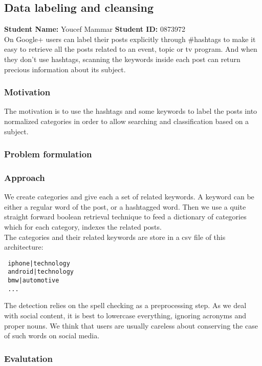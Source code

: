 \subsection{Data labeling and cleansing}
\textbf{Student Name: }Youcef Mammar \textbf{Student ID:} 0873972\\

On Google+ users can label their posts explicitly through \#hashtags to make it easy to retrieve 
all the posts related to an event, topic or tv program. And when they don’t use hashtags, 
scanning the keywords inside each post can return precious information about its subject.

\subsubsection*{Motivation}
The motivation is to use the hashtags and some keywords to label the posts into normalized categories 
in order to allow searching and classification based on a subject.

\subsubsection*{Problem formulation}

\subsubsection*{Approach}
We create categories and give each a set of related keywords. A keyword can be either a regular word of 
the post, or a hashtagged word. Then we use a quite straight forward boolean retrieval technique to 
feed a dictionary of categories which for each category, indexes the related posts. \\
The categories and their related keywords are store in a csv file of this architecture:

\begin{verbatim}
 iphone|technology
 android|technology
 bmw|automotive
 ...
\end{verbatim}

The detection relies on the spell checking as a preprocessing step. As we deal with social content, it is 
best to lowercase everything, ignoring acronyms and proper nouns. We think that users are usually careless 
about conserving the case of such words on social media.

\subsubsection{Evalutation}


